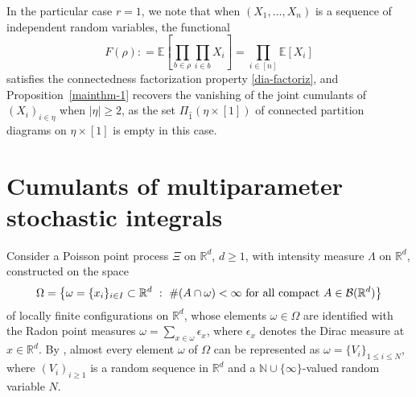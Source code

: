 \documentclass[bj,authoryear,noshowframe]{imsart}
\theoremstyle{plain}
\theoremstyle{remark}
\newcommand{\E}{\mathbb{E}}
\newcommand{\N}{\mathbb{N}}
\newcommand{\R}{\mathbb{R}}
\def\real{{\mathord{\mathbb R}}}
\newtheorem{remark}[prop]{Remark}
\begin{document}
  In the particular case $r=1$, we note that when
 $(X_1,\ldots , X_n)$ is a sequence of independent random variables, the functional 
 $$
 F(\rho) :
 = \E\left[ \prod_{b \in \rho} \prod_{i \in b} X_i \right]
 = \prod_{i \in [n]} \E [ X_i ]
 $$ 
 satisfies
 the {connectedness factorization} property \eqref{dia-factoriz},
 and Proposition~\ref{mainthm-1}
  recovers the vanishing of the joint cumulants
  of $(X_i)_{i\in \eta}$ when $|\eta |\geq 2$, as
  the set $\Pi_{\widehat{1}} ( \eta \times [1] )$
  of connected partition diagrams on $\eta \times [1]$
  is empty in this case. 
 \vspace{-0.1cm}
 \section{Cumulants of multiparameter stochastic integrals} 
 \label{s4}
 \vspace{-0.1cm}
 \noindent 
  Consider a Poisson point process $\Xi$ on $\R^d$, $d \geq 1$, with intensity
 measure $\Lambda$ on $\real^d$, %
  constructed on the space $$
  \Omega = \big\{
  \omega = \{ x_i \}_{i\in I} \subset \R^d \ : \
  \#( A \cap \omega ) < \infty 
  \mbox{ for all compact } A\in {\cal B} (\R^d) 
  \big\}
  $$
  of locally finite configurations on $\R^d$, whose elements 
  $\omega \in \Omega$ are identified with the Radon point measures 
  $\displaystyle \omega = \sum_{x\in \omega} \epsilon_x$, 
  where $\epsilon_x$ denotes the Dirac measure at $x\in \R^d$. 
  By \cite[Corollary~6.5]{LastPenrose17}, almost every
  element $ \omega$ of $\Omega$ 
  can be represented as $\omega =\{V_i\}_{1\leq i\leq N}$,
  where $(V_i)_{i\geq 1}$ is a random sequence 
  in $\R^d$ and a $\N\cup\{\infty\}$-valued random variable $N$.
 
\end{document}
